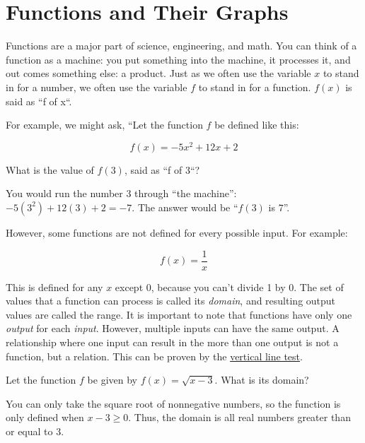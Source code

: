 \chapter{Functions and Their Graphs}

Functions are a major part of science, engineering, and math. You can think of a function as a machine: you put something into the
machine, it processes it, and out comes something else: a product. Just as we
often use the variable $x$ to stand in for a number, we often use the
variable $f$ to stand in for a function. $f(x)$ is said as ``f of x``.

For example, we might ask, ``Let the function $f$ be defined like this:

\begin{equation*}
f(x) = -5x^2 + 12x + 2
\end{equation*}

What is the value of $f(3)$, said as ``f of 3``?

You would run the number 3 through ``the machine'': $-5(3^2) + 12(3) + 2 = -7$. The answer would be ``$f(3)$ is $7$''.

However, some functions are not defined for every possible input. For example:

\begin{equation*}
  f(x) = \frac{1}{x}
\end{equation*}

  This is defined for any $x$ except 0, because you can't divide 1 by 0. The set of values that a function can process is called its \textit{domain}, and resulting output values are called the range.
  It is important to note that functions have only one \emph{output} for each \emph{input}. However, multiple inputs can have the same output. 
  A relationship where one input can result in the more than one output is not a function, but a relation. This can be proven by the \hyperref[sec:vertical]{vertical line test}.

\begin{Exercise}[title={Domain of a function}, label=function_domain]

  Let the function $f$ be given by $f(x) = \sqrt{x - 3}$.  What is its domain?

\end{Exercise}
\begin{Answer}[ref=function_domain]
  You can only take the square root of nonnegative numbers, so the
  function is only defined when $x - 3 \geq 0$.  Thus, the domain is
  all real numbers greater than or equal to 3.
\end{Answer}

